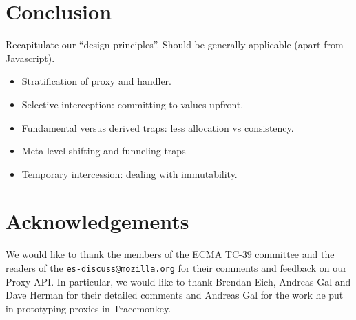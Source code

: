 \documentclass{acm_proc_article-sp}
\begin{document}
\section{Conclusion}

Recapitulate our ``design principles''. Should be generally applicable (apart from Javascript).
\begin{itemize}
  \item Stratification of proxy and handler.
  \item Selective interception: committing to values upfront.
  \item Fundamental versus derived traps: less allocation vs consistency.
  \item Meta-level shifting and funneling traps
  \item Temporary intercession: dealing with immutability.
\end{itemize}

\section*{Acknowledgements}

We would like to thank the members of the ECMA TC-39 committee and the readers of the \texttt{es-discuss@mozilla.org} for their comments and feedback on our Proxy API. In particular, we would like to thank Brendan Eich, Andreas Gal and Dave Herman for their detailed comments and Andreas Gal for the work he put in prototyping proxies in Tracemonkey.



\end{document}
